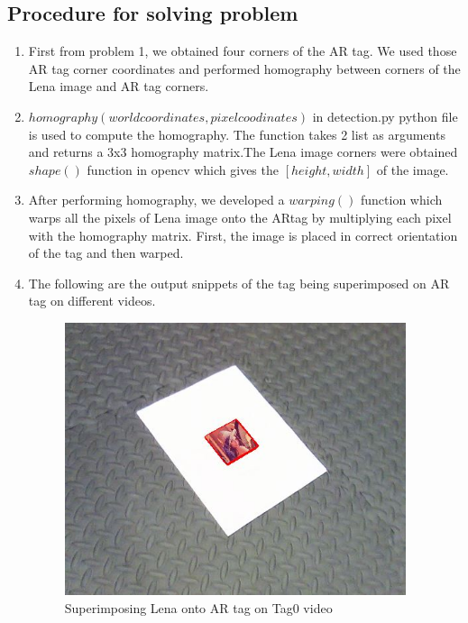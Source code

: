 \documentclass[12pt]{article}
\begin{document}
\subsection{Procedure for solving problem }
\begin{enumerate}
\item First from problem 1, we obtained four corners of the AR tag. We used those AR tag corner coordinates and performed homography between corners of the Lena image and AR tag corners.
\item $homography(worldcoordinates, pixelcoodinates)$ in detection.py python file is used to compute the homography. The function takes 2 list as arguments and returns a 3x3 homography matrix.The Lena image corners were obtained $shape()$ function in opencv which gives the $[height, width]$ of the image.


\item After performing homography, we developed a $warping()$ function which warps all the pixels of Lena image onto the ARtag by multiplying each pixel with the homography matrix. First, the image is placed in correct orientation of the tag and then warped.

\item The following are the output snippets of the tag being superimposed on AR tag on different videos.
\begin{figure}[h]
    \centering
    \includegraphics[width=10cm]{Tag0_videooutput}
    \caption{Superimposing Lena onto AR tag on Tag0 video}
    \label{fig:video frame output}
\end{figure}


\end{enumerate}
\end{document}
